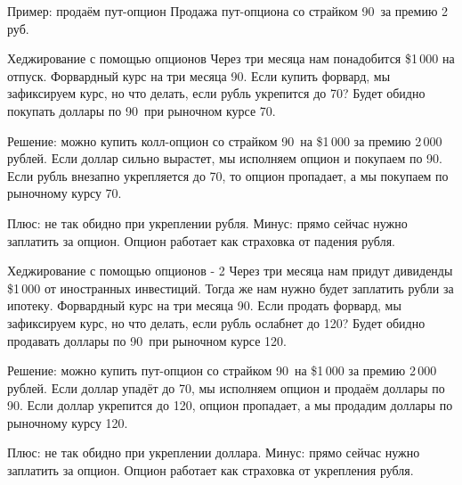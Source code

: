 \documentclass{beamer}
\newcommand{\usdrubstrike}{90}
\newcommand{\usdrubaxisspread}{8}
\newcommand{\usdrublow}{70}
\newcommand{\usdrubhigh}{120}
\begin{document}
\begin{frame}{Пример: продаём пут-опцион}
\justifying
Продажа пут-опциона со страйком \usdrubstrike\ за премию 2 руб.

\justifying
\centering
\end{frame}



\begin{frame}{Хеджирование с помощью опционов}
\justify
Через три месяца нам понадобится \$1\,000 на отпуск. Форвардный курс на три месяца \usdrubstrike. Если купить форвард, мы зафиксируем курс, но что делать, если рубль укрепится до \usdrublow? Будет обидно покупать доллары по \usdrubstrike\ при рыночном курсе \usdrublow.

\justify
Решение: можно купить колл-опцион со страйком \usdrubstrike\ на \$1\,000 за премию 2\,000 рублей. Если доллар сильно вырастет, мы исполняем опцион и покупаем по \usdrubstrike. Если рубль внезапно укрепляется до \usdrublow, то опцион пропадает, а мы покупаем по рыночному курсу \usdrublow.

\justify
Плюс: не так обидно при укреплении рубля. Минус: прямо сейчас нужно заплатить за опцион. Опцион работает как страховка от падения рубля.
\end{frame}




\begin{frame}{Хеджирование с помощью опционов - 2}
\justify
Через три месяца нам придут дивиденды \$1\,000 от иностранных инвестиций. Тогда же нам нужно будет заплатить рубли за ипотеку. Форвардный курс на три месяца \usdrubstrike. Если продать форвард, мы зафиксируем курс, но что делать, если рубль ослабнет до \usdrubhigh? Будет обидно продавать доллары по \usdrubstrike\ при рыночном курсе \usdrubhigh.

\justify
Решение: можно купить пут-опцион со страйком \usdrubstrike\ на \$1\,000 за премию 2\,000 рублей. Если доллар упадёт до \usdrublow, мы исполняем опцион и продаём доллары по \usdrubstrike. Если доллар укрепится до \usdrubhigh, опцион пропадает, а мы продадим доллары по рыночному курсу \usdrubhigh.

\justify
Плюс: не так обидно при укреплении доллара. Минус: прямо сейчас нужно заплатить за опцион. Опцион работает как страховка от укрепления рубля.
\end{frame}
\end{document}
